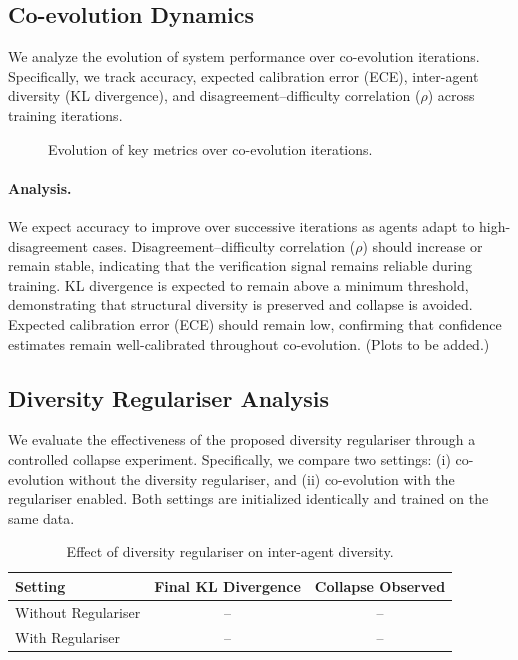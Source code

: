 \documentclass{article}
\begin{document}
\subsection{Co-evolution Dynamics}

We analyze the evolution of system performance over co-evolution iterations. Specifically, we track accuracy, expected calibration error (ECE), inter-agent diversity (KL divergence), and disagreement–difficulty correlation ($\rho$) across training iterations.

\begin{figure}[h]
\centering
{}
\caption{Evolution of key metrics over co-evolution iterations.}
\label{fig:dynamics}
\end{figure}

\paragraph{Analysis.}
We expect accuracy to improve over successive iterations as agents adapt to high-disagreement cases. Disagreement–difficulty correlation ($\rho$) should increase or remain stable, indicating that the verification signal remains reliable during training. KL divergence is expected to remain above a minimum threshold, demonstrating that structural diversity is preserved and collapse is avoided. Expected calibration error (ECE) should remain low, confirming that confidence estimates remain well-calibrated throughout co-evolution. (Plots to be added.)

\subsection{Diversity Regulariser Analysis}

We evaluate the effectiveness of the proposed diversity regulariser through a controlled collapse experiment. Specifically, we compare two settings: (i) co-evolution without the diversity regulariser, and (ii) co-evolution with the regulariser enabled. Both settings are initialized identically and trained on the same data.

\begin{table}[h]
\centering
\caption{Effect of diversity regulariser on inter-agent diversity.}
\label{tab:regulariser_results}
\begin{tabular}{lcc}
\toprule
\textbf{Setting} & \textbf{Final KL Divergence} & \textbf{Collapse Observed} \\
\midrule
Without Regulariser & -- & -- \\
With Regulariser & -- & -- \\
\bottomrule
\end{tabular}
\end{table}
\end{document}
